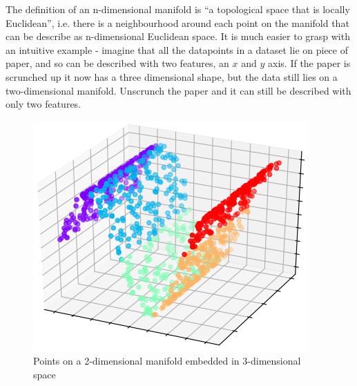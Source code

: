 The definition of an n-dimensional manifold is ``a 
topological space that is locally Euclidean'', i.e. there is a neighbourhood around each point on the manifold that can be describe as n-dimensional 
Euclidean space. It is much easier to grasp with an intuitive example - imagine that all the datapoints in a 
dataset lie on piece of paper, and so can be described with two features, an $x$ and $y$ axis. If the paper is scrunched up 
it now has a three dimensional shape, but the data still lies on a two-dimensional manifold. Unscrunch the paper and it can still 
be described with only two features.
\begin{figure}[H]
  \centering
  \includegraphics[scale=.5]{figs/manifold.png}
  \caption{Points on a 2-dimensional manifold embedded in 3-dimensional space}
  \label{fig:manifold}
\end{figure}

